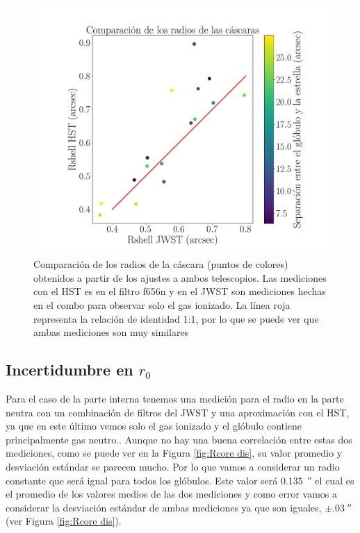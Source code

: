 \documentclass{book}
\begin{document}
\begin{figure}[htb]
    \centering
    \includegraphics[width=\textwidth]{Nuevas imagenes finales/R_shell_r.pdf}
    \caption{Comparación de los radios de la cáscara (puntos de colores) obtenidos a partir de los ajustes a ambos telescopios. Las mediciones con el HST es en el filtro f656n y en el JWST son mediciones hechas en el combo para observar solo el gas ionizado. La línea roja representa la relación de identidad 1:1, por lo que se puede ver que ambas mediciones son muy similares}
    \label{fgi: Radios de la cascara}
\end{figure}

\subsection{\boldmath Incertidumbre en $r_0$}

Para el caso de la parte interna tenemos una medición para el radio en la parte neutra con un combinación de filtros del JWST y una aproximación con el HST, ya que en este último vemos solo el gas ionizado y el glóbulo contiene principalmente gas neutro.. Aunque no hay una buena correlación entre estas dos mediciones, como se puede ver en la Figura \ref{fig:Rcore dis}, su valor promedio y desviación estándar se parecen mucho. Por lo que vamos a considerar un radio constante que será igual para todos los glóbulos. Este valor será \SI{0.135}{\arcsecond} el cual es el promedio de los valores medios de las dos mediciones y como error vamos a considerar la desviación estándar de ambas mediciones ya que son iguales, $\pm\SI{.03}{\arcsecond}$ (ver Figura \ref{fig:Rcore dis}).
\end{document}
